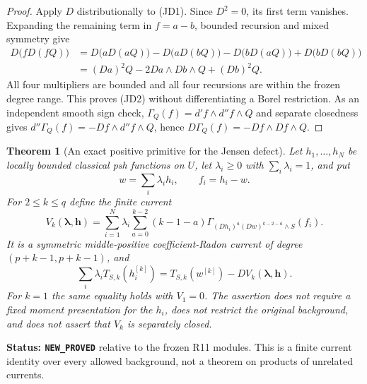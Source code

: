 \documentclass[11pt,a4paper]{article}
\numberwithin{equation}{section}
\newtheorem{theorem}{Theorem}[section]
\theoremstyle{definition}
\theoremstyle{remark}
\begin{document}
\begin{proof}
Apply $D$ distributionally to (JD1).  Since $D^2=0$, its first
term vanishes.  Expanding the remaining term in $f=a-b$, bounded
recursion and mixed symmetry give
\[
 \begin{split}
 D\bigl(fD(fQ)\bigr)
 &=D\bigl(aD(aQ)\bigr)-D\bigl(aD(bQ)\bigr)
       -D\bigl(bD(aQ)\bigr)+D\bigl(bD(bQ)\bigr)\\
 &=(Da)^2Q-2Da\wedge Db\wedge Q+(Db)^2Q.
 \end{split}
\]
All four multipliers are bounded and all four recursions are within
the frozen degree range.  This proves (JD2) without differentiating
a Borel restriction.  As an independent smooth sign check,
$\Gamma_Q(f)=d'f\wedge d''f\wedge Q$ and separate closedness gives
$d''\Gamma_Q(f)=-Df\wedge d''f\wedge Q$, hence
$D\Gamma_Q(f)=-Df\wedge Df\wedge Q$.
\end{proof}

\begin{theorem}[An exact positive primitive for the Jensen defect]
\label{thm:r12-positive-jensen-current}
Let $h_1,\ldots,h_N$ be locally bounded classical psh functions on
$U$, let $\lambda_i\geq0$ with $\sum_i\lambda_i=1$, and put
\[
 w=\sum_i\lambda_i h_i,\qquad f_i=h_i-w.
\]
For $2\leq k\leq q$ define the finite current
\[
 V_k(\boldsymbol\lambda,\mathbf h)
  =\sum_{i=1}^N\lambda_i\sum_{a=0}^{k-2}(k-1-a)
       \Gamma_{(Dh_i)^a(Dw)^{k-2-a}\wedge S}(f_i).
 \tag{JD3}
\]
It is a symmetric middle-positive coefficient-Radon current of degree
$(p+k-1,p+k-1)$, and
\[
 \boxed{\quad
 \sum_i\lambda_i T_{S,k}(h_i^{[k]})
       =T_{S,k}(w^{[k]})-D V_k(\boldsymbol\lambda,\mathbf h).
 \quad}
 \tag{JD4}
\]
For $k=1$ the same equality holds with $V_1=0$.  The assertion does
not require a fixed moment presentation for the $h_i$, does not
restrict the original background, and does not assert that $V_k$
is separately closed.
\end{theorem}

\noindent\textbf{Status: \texttt{NEW\_PROVED}} relative to the frozen
R11 modules.  This is a finite current identity over every allowed
background, not a theorem on products of unrelated currents.
\end{document}
